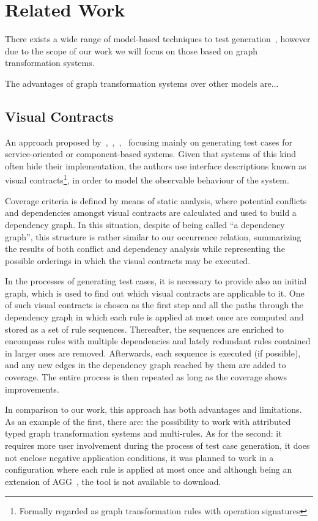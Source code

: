 \chapter{Related Work}\label{ch:related-work}

There exists a wide range of model-based techniques to test generation~\cite{Utting2006}, however due to the scope of our work we will focus on those based on graph transformation systems.

The advantages of graph transformation systems over other models are...

\section{Visual Contracts}

An approach proposed by~\cite{Heckel2011},~\cite{Khan2012},~\cite{Khan2012a},~\cite{Runge2013} focusing mainly on generating test cases for service-oriented or component-based systems. Given that systems of this kind often hide their implementation, the authors use interface descriptions known as visual contracts\footnote{ Formally regarded as graph transformation rules with operation signatures}, in order to model the observable behaviour of the system.

Coverage criteria is defined by means of static analysis, where potential conflicts and dependencies amongst visual contracts are calculated and used to build a dependency graph. In this situation, despite of being called ``a dependency graph'', this structure is rather similar to our occurrence relation, summarizing the results of both conflict and dependency analysis while representing the possible orderings in which the visual contracts may be executed.

In the processes of generating test cases, it is necessary to provide also an initial graph, which is used to find out which visual contracts are applicable to it. One of such visual contracts is chosen as the first step and all the paths through the dependency graph in which each rule is applied at most once are computed and stored as a set of rule sequences. Thereafter, the sequences are enriched to encompass rules with multiple dependencies and lately redundant rules contained in larger ones are
removed. Afterwards, each sequence is executed (if possible), and any new edges in the dependency graph reached by them are added to coverage. The entire process is then repeated as long as the coverage shows improvements. 

In comparison to our work, this approach has both advantages and limitations. As an example of the first, there are: the possibility to work with attributed typed graph transformation systems and multi-rules. As for the second: it requires more user involvement during the process of test case generation, it does not enclose negative application conditions, it was planned to work in a configuration where each rule is applied at most once and although being an extension of
AGG~\cite{Taentzer2000}, the tool is not available to download.

